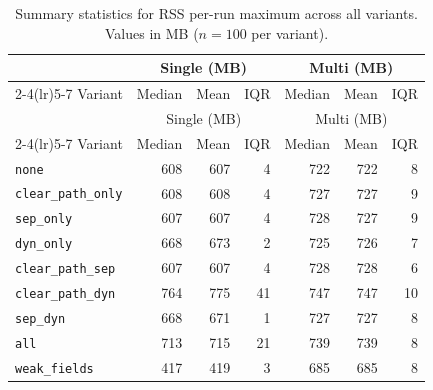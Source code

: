 \begin{longtable}[c]{l rrr rrr}
\caption[Total process RSS summary statistics]{Summary statistics for RSS per-run maximum across all variants. Values in MB ($n=100$ per variant).}\label{tab:stats-memory-rss} \\
\toprule
 & \multicolumn{3}{c}{Single (MB)} & \multicolumn{3}{c}{Multi (MB)} \\
\cmidrule(lr){2-4}\cmidrule(lr){5-7}
Variant & Median & Mean & IQR & Median & Mean & IQR \\
\midrule
\endfirsthead
\toprule
 & \multicolumn{3}{c}{Single (MB)} & \multicolumn{3}{c}{Multi (MB)} \\
\cmidrule(lr){2-4}\cmidrule(lr){5-7}
Variant & Median & Mean & IQR & Median & Mean & IQR \\
\midrule
\endhead
\bottomrule
\endfoot
\texttt{none} & 608 & 607 & 4 & 722 & 722 & 8 \\
\texttt{clear\_path\_only} & 608 & 608 & 4 & 727 & 727 & 9 \\
\texttt{sep\_only} & 607 & 607 & 4 & 728 & 727 & 9 \\
\texttt{dyn\_only} & 668 & 673 & 2 & 725 & 726 & 7 \\
\texttt{clear\_path\_sep} & 607 & 607 & 4 & 728 & 728 & 6 \\
\texttt{clear\_path\_dyn} & 764 & 775 & 41 & 747 & 747 & 10 \\
\texttt{sep\_dyn} & 668 & 671 & 1 & 727 & 727 & 8 \\
\texttt{all} & 713 & 715 & 21 & 739 & 739 & 8 \\
\texttt{weak\_fields} & 417 & 419 & 3 & 685 & 685 & 8 \\
\end{longtable}
